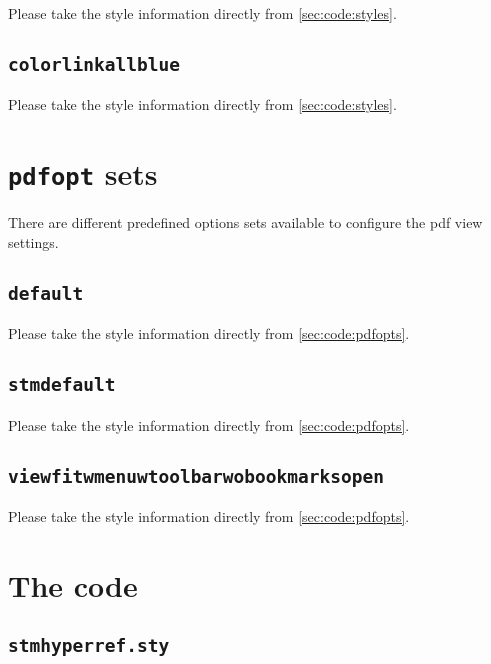\documentclass[%
  type=article,%
  layout=koma,%
  conditionallox=true,%
  conditionalloxnewpage=false,%
  date=true,%
  index=true,%
  listings=true%
]{stmtext}
\begin{document}
Please take the style information directly from \cref{sec:code:styles}.

\subsection{\protect\texttt{colorlinkallblue}}
\label{sec:styles:colorlinkallblue}

Please take the style information directly from \cref{sec:code:styles}.

\section{\protect\texttt{pdfopt} sets}
\label{sec:pdfopts}

There are different predefined options sets available to configure the pdf view settings.

\subsection{\protect\texttt{default}}
\label{sec:pdfopts:default}

Please take the style information directly from \cref{sec:code:pdfopts}.

\subsection{\protect\texttt{stmdefault}}
\label{sec:pdfopts:stmdefault}

Please take the style information directly from \cref{sec:code:pdfopts}.

\subsection{\protect\texttt{viewfitwmenuwtoolbarwobookmarksopen}}
\label{sec:pdfopts:viewfitwmenuwtoolbarwobookmarksopen}

Please take the style information directly from \cref{sec:code:pdfopts}.

\printstmindex

\newpage
\appendix

\section{The code}
\label{sec:code}

\subsection{\protect\texttt{stmhyperref.sty}}
\label{sec:code:main}
\end{document}
